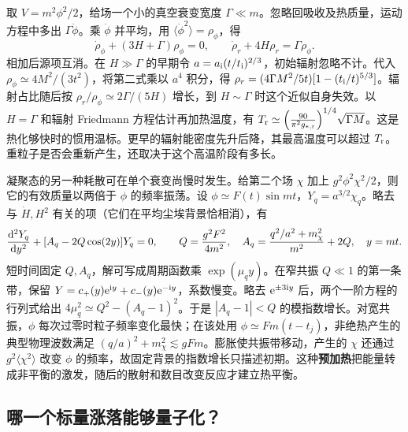 取 $V=m^2\phi^2/2$，给场一个小的真空衰变宽度 $\Gamma\ll m$。忽略回吸收及热质量，运动方程中多出 $\Gamma\dot\phi$。乘 $\dot\phi$ 并平均，用 $\langle\dot\phi^2\rangle=\rho_\phi$，得
\begin{equation}\label{eq:cosmo-inf-decay}
 \dot\rho_\phi+(3H+\Gamma)\rho_\phi=0,\qquad
 \dot\rho_r+4H\rho_r=\Gamma\rho_\phi .
\end{equation}
相加后源项互消。在 $H\gg\Gamma$ 的早期令 $a=a_{\rm i}(t/t_{\rm i})^{2/3}$，初始辐射忽略不计。代入 $\rho_\phi\simeq4M^2/(3t^2)$，将第二式乘以 $a^4$ 积分，得 $\rho_r=(4\Gamma M^2/5t)[1-(t_{\rm i}/t)^{5/3}]$。辐射占比随后按 $\rho_r/\rho_\phi\simeq2\Gamma/(5H)$ 增长，到 $H\sim\Gamma$ 时这个近似自身失效。以 $H=\Gamma$ 和辐射 Friedmann 方程估计再加热温度，有 $T_{\rm r}\simeq\left(\frac{90}{\pi^2g_{*,{\rm r}}}\right)^{1/4}\!\sqrt{\Gamma M}$。这是热化够快时的惯用温标。更早的辐射能密度先升后降，其最高温度可以超过 $T_{\rm r}$。重粒子是否会重新产生，还取决于这个高温阶段有多长。

凝聚态的另一种耗散可在单个衰变尚慢时发生。给第二个场 $\chi$ 加上 $g^2\phi^2\chi^2/2$，则它的有效质量以两倍于 $\phi$ 的频率振荡。设 $\phi\simeq F(t)\sin mt$，$Y_q=a^{3/2}\chi_q$。略去与 $\dot H,H^2$ 有关的项（它们在平均尘埃背景恰相消），有
\begin{equation}\label{eq:cosmo-inf-mathieu}
 \frac{\dd^2Y_q}{\dd y^2}
 +[A_q-2Q\cos(2y)]Y_q=0,\qquad
 Q=\frac{g^2F^2}{4m^2},\quad
 A_q=\frac{q^2/a^2+m_\chi^2}{m^2}+2Q,\quad y=mt .
\end{equation}
短时间固定 $Q,A_q$，解可写成周期函数乘 $\exp(\mu_q y)$。在窄共振 $Q\ll1$ 的第一条带，保留 $Y=c_+(y)\mathrm{e}^{\mathrm{i} y}+c_-(y)\mathrm{e}^{-\mathrm{i} y}$，系数慢变。略去 $\mathrm{e}^{\pm3\mathrm{i} y}$ 后，两个一阶方程的行列式给出 $4\mu_q^2\simeq Q^2-(A_q-1)^2$。于是 $|A_q-1|<Q$ 的模指数增长。对宽共振，$\phi$ 每次过零时粒子频率变化最快；在该处用 $\phi\simeq Fm(t-t_j)$，非绝热产生的典型物理波数满足 $(q/a)^2+m_\chi^2\lesssim gFm$。膨胀使共振带移动，产生的 $\chi$ 还通过 $g^2\langle\chi^2\rangle$ 改变 $\phi$ 的频率，故固定背景的指数增长只描述初期。这种\textbf{预加热}把能量转成非平衡的激发，随后的散射和数目改变反应才建立热平衡。

\subsection{哪一个标量涨落能够量子化？}\label{sec:cosmo-inf-constraints}

